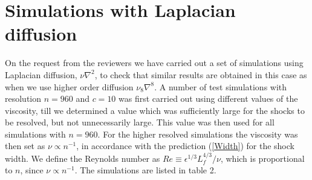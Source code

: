 \documentclass{jfm}
\begin{document}
\appendix

\section{Simulations with Laplacian diffusion}
On the request from the reviewers we have carried out a set of simulations using Laplacian diffusion, $ \nu \nabla^{2} $, to check that similar results are obtained in this case as when we use higher order diffusion $ \nu_8 \nabla^{8} $. 
A number of test simulations with resolution $ n = 960 $ and $ c= 10 $ was first carried out using different values of the viscosity, till we determined a value which was sufficiently large for the shocks to be resolved, but not unnecessarily large. 
This value was then used for all simulations with $ n = 960 $. For the higher resolved simulations the viscosity was then set as $ \nu \propto n^{-1} $, in accordance with the prediction  (\ref{Width}) for the shock width.
We define the Reynolds number as $ Re \equiv \epsilon^{1/3} L_f^{4/3}/\nu $, which is proportional to $ n $, since $ \nu \propto n^{-1} $.
The simulations are listed in table 2.  
\end{document}
